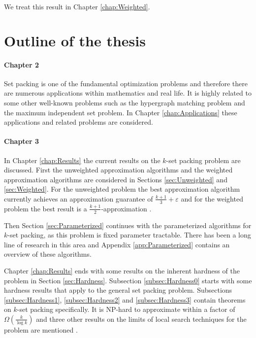 We treat this result in Chapter \ref{chap:Weighted}.

\section{Outline of the thesis}\label{sec:Outline}

\paragraph{Chapter 2} Set packing is one of the fundamental optimization problems and therefore there are numerous applications within mathematics and real life. It is highly related to some other well-known problems such as the hypergraph matching problem and the maximum independent set problem. In Chapter \ref{chap:Applications} these applications and related problems are considered.

\paragraph{Chapter 3} In Chapter \ref{chap:Results} the current results on the $k$-set packing problem are discussed. First the unweighted approximation algorithms and the weighted approximation algorithms are considered in Sections \ref{sec:Unweighted} and \ref{sec:Weighted}. For the unweighted problem the best approximation algorithm currently achieves an approximation guarantee of $\frac{k+1}{3} + \varepsilon$ \cite{Cygan,FurerYu} and for the weighted problem the best result is a $\frac{k+1}{2}$-approximation \cite{Berman}.

Then Section \ref{sec:Parameterized} continues with the parameterized algorithms for $k$-set packing, as this problem is fixed parameter tractable. There has been a long line of research in this area and Appendix \ref{app:Parameterized} contains an overview of these algorithms.

Chapter \ref{chap:Results} ends with some results on the inherent hardness of the problem in Section \ref{sec:Hardness}. Subsection \ref{subsec:Hardness0} starts with some hardness results that apply to the general set packing problem. Subsections \ref{subsec:Hardness1}, \ref{subsec:Hardness2} and \ref{subsec:Hardness3} contain theorems on $k$-set packing specifically. It is NP-hard to approximate within a factor of $\Omega\left(\frac{k}{\log k}\right)$ \cite{Hazan} and three other results on the limits of local search techniques for the problem are mentioned \cite{Cygan,FurerYu,Sviridenko}.

